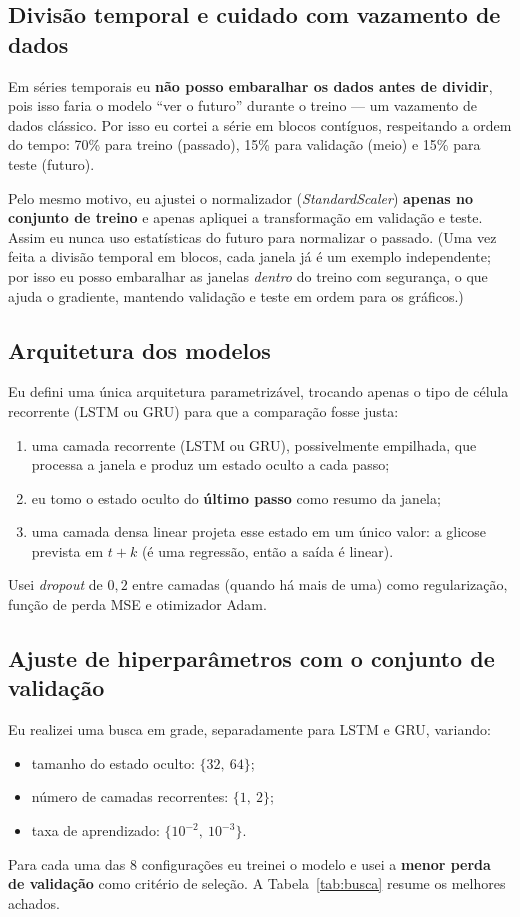 \documentclass[11pt,a4paper]{article}
\begin{document}
\subsection{Divisão temporal e cuidado com vazamento de dados}

Em séries temporais eu \textbf{não posso embaralhar os dados antes de dividir},
pois isso faria o modelo ``ver o futuro'' durante o treino --- um vazamento de
dados clássico. Por isso eu cortei a série em blocos contíguos, respeitando a
ordem do tempo: 70\% para treino (passado), 15\% para validação (meio) e 15\%
para teste (futuro).

Pelo mesmo motivo, eu ajustei o normalizador (\emph{StandardScaler})
\textbf{apenas no conjunto de treino} e apenas apliquei a transformação em
validação e teste. Assim eu nunca uso estatísticas do futuro para normalizar o
passado. (Uma vez feita a divisão temporal em blocos, cada janela já é um
exemplo independente; por isso eu posso embaralhar as janelas \emph{dentro} do
treino com segurança, o que ajuda o gradiente, mantendo validação e teste em
ordem para os gráficos.)

\subsection{Arquitetura dos modelos}

Eu defini uma única arquitetura parametrizável, trocando apenas o tipo de
célula recorrente (LSTM ou GRU) para que a comparação fosse justa:
\begin{enumerate}
  \item uma camada recorrente (LSTM ou GRU), possivelmente empilhada, que
        processa a janela e produz um estado oculto a cada passo;
  \item eu tomo o estado oculto do \textbf{último passo} como resumo da janela;
  \item uma camada densa linear projeta esse estado em um único valor: a
        glicose prevista em $t+k$ (é uma regressão, então a saída é linear).
\end{enumerate}
Usei \emph{dropout} de $0{,}2$ entre camadas (quando há mais de uma) como
regularização, função de perda MSE e otimizador Adam.

\subsection{Ajuste de hiperparâmetros com o conjunto de validação}

Eu realizei uma busca em grade, separadamente para LSTM e GRU, variando:
\begin{itemize}
  \item tamanho do estado oculto: $\{32,\ 64\}$;
  \item número de camadas recorrentes: $\{1,\ 2\}$;
  \item taxa de aprendizado: $\{10^{-2},\ 10^{-3}\}$.
\end{itemize}
Para cada uma das 8 configurações eu treinei o modelo e usei a
\textbf{menor perda de validação} como critério de seleção. A
Tabela~\ref{tab:busca} resume os melhores achados.
\end{document}
